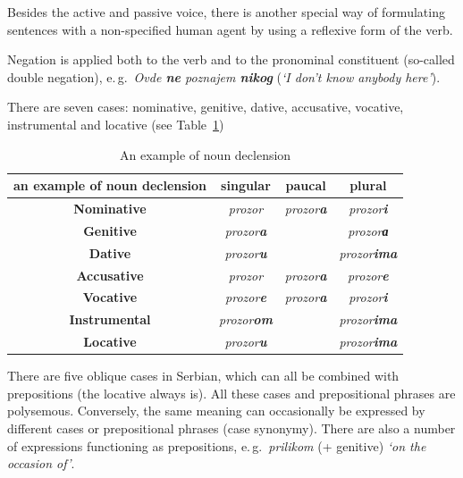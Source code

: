{\begin{multicols}{2}
Besides the active and passive voice, there is another special way of formulating sentences with a non-specified human agent by using a reflexive form of the verb. 

Negation is applied both to the verb and to the pronominal constituent (so-called double negation), e.\,g.~\textit{Ovde \textbf{ne} poznajem \textbf{nikog}} (\textit{‘I don’t know anybody here’}).

There are seven cases: nominative, genitive, dative, accusative, vocative, instrumental and locative (see Table~\ref{declension}) 

\begin{table}[ht]
\begin{center}
\begin{tabular}{|c|c|c|c|}
\hline
{\textbf{an example of noun declension}} & {\textbf{singular}} & {\textbf{paucal}} & {\textbf{plural}} \\
\hline
{\textbf{Nominative}} & \textit{prozor} & \textit{prozor\textbf{a}} & \textit{prozor\textbf{i}} \\
\hline
{\textbf{Genitive}} & \textit{prozor\textbf{a}} & & \textit{prozor\textbf{а}} \\
\hline
{\textbf{Dative}} & \textit{prozor\textbf{u}} & & \textit{prozor\textbf{ima}} \\
\hline
{\textbf{Accusative}} & \textit{prozor} & \textit{prozor\textbf{a}} & \textit{prozor\textbf{e}} \\
\hline
{\textbf{Vocative}} & \textit{prozor\textbf{e}} & \textit{prozor\textbf{a}} & \textit{prozor\textbf{i}} \\
\hline
{\textbf{Instrumental}} & \textit{prozor\textbf{om}} & & \textit{prozor\textbf{ima}} \\
\hline
{\textbf{Locative}} & \textit{prozor\textbf{u}} & & \textit{prozor\textbf{ima}} \\
\hline
\end{tabular}
\end{center}
\caption{An example of noun declension}
\label{declension} 
\end{table}

There are five oblique cases in Serbian, which can all be combined with prepositions (the locative always is). All these cases and prepositional phrases are polysemous. Conversely, the same meaning can occasionally be expressed by different cases or prepositional phrases (case synonymy). There are also a number of expressions functioning as prepositions, e.\,g.~\textit{prilikom} (+ genitive) \textit{‘on the occasion of’}.


\end{multicols}}
